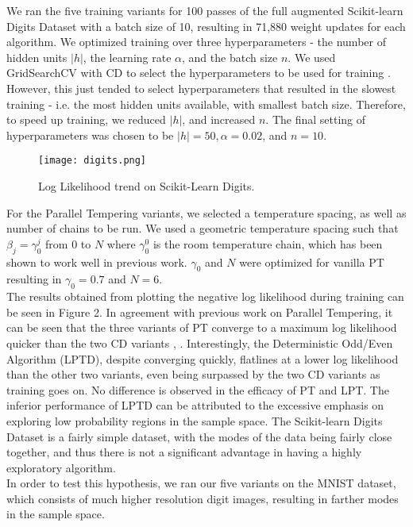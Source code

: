 We ran the five training variants for 100 passes of the full augmented Scikit-learn Digits Dataset with a batch size of 10, resulting in 71,880 weight updates for each algorithm. We optimized training over three hyperparameters - the number of hidden units $|h|$, the learning rate $\alpha$, and the batch size $n$. We used GridSearchCV with CD to select the hyperparameters to be used for training \cite{pedregosa2011scikit}. However, this just tended to select hyperparameters that resulted in the slowest training - i.e. the most hidden units available, with smallest batch size. Therefore, to speed up training, we reduced $|h|$, and increased $n$. The final setting of hyperparameters was chosen to be $|h|=50, \alpha = 0.02$, and $n=10$.\\

\begin{figure}[ht!]
	\centering
	\texttt{[image: digits.png]}
\caption{Log Likelihood trend on Scikit-Learn Digits.}
\end{figure}

For the Parallel Tempering variants, we selected a temperature spacing, as well as number of chains to be run. We used a geometric temperature spacing such that $\beta_j = \gamma_{0}^j$ from $0$ to $N$ where $\gamma_0^0$ is the room temperature chain, which has been shown to work well in previous work. $\gamma_0$ and $N$ were optimized for vanilla PT resulting in $\gamma_0 = 0.7$ and $N=6$.\\

The results obtained from plotting the negative log likelihood during training can be seen in Figure 2. In agreement with previous work on Parallel Tempering, it can be seen that the three variants of PT converge to a maximum log likelihood quicker than the two CD variants \cite{desjardins2010tempered}, \cite{fischer2014training}. Interestingly, the Deterministic Odd/Even Algorithm (LPTD), despite converging quickly, flatlines at a lower log likelihood than the other two variants, even being surpassed by the two CD variants as training goes on. No difference is observed in the efficacy of PT and LPT. The inferior performance of LPTD can be attributed to the excessive emphasis on exploring low probability regions in the sample space. The Scikit-learn Digits Dataset is a fairly simple dataset, with the modes of the data being fairly close together, and thus there is not a significant advantage in having a highly exploratory algorithm.\\

In order to test this hypothesis, we ran our five variants on the MNIST dataset, which consists of much higher resolution digit images, resulting in farther modes in the sample space.

